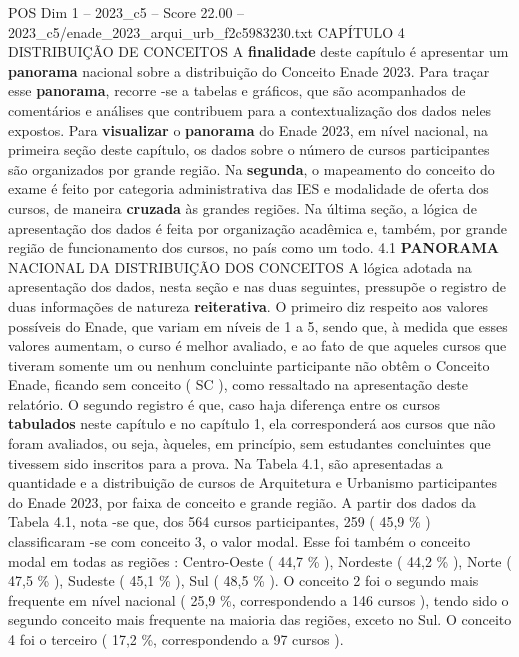\begin{textsample}{POS Dim 1 – 2023\_c5 – Score 22.00 – 2023\_c5/enade\_2023\_arqui\_urb\_f2c5983230.txt}  \label{ex:f1_pos_008}
CAPÍTULO 4 DISTRIBUIÇÃO DE CONCEITOS A \textbf{finalidade} deste capítulo é apresentar um \textbf{panorama} nacional sobre a distribuição do Conceito Enade 2023.
Para traçar esse \textbf{panorama}, recorre -se a tabelas e gráficos, que são acompanhados de comentários e análises que contribuem para a contextualização dos dados neles expostos.
Para \textbf{visualizar} o \textbf{panorama} do Enade 2023, em nível nacional, na primeira seção deste capítulo, os dados sobre o número de cursos participantes são organizados por grande região.
Na \textbf{segunda}, o mapeamento do conceito do exame é feito por categoria administrativa das IES e modalidade de oferta dos cursos, de maneira \textbf{cruzada} às grandes regiões.
Na última seção, a lógica de apresentação dos dados é feita por organização acadêmica e, também, por grande região de funcionamento dos cursos, no país como um todo. 4.1 \textbf{PANORAMA} NACIONAL DA DISTRIBUIÇÃO DOS CONCEITOS A lógica adotada na apresentação dos dados, nesta seção e nas duas seguintes, pressupõe o registro de duas informações de natureza \textbf{reiterativa}.
O primeiro diz respeito aos valores possíveis do Enade, que variam em níveis de 1 a 5, sendo que, à medida que esses valores aumentam, o curso é melhor avaliado, e ao fato de que aqueles cursos que tiveram somente um ou nenhum concluinte participante não obtêm o Conceito Enade, ficando sem conceito ( SC ), como ressaltado na apresentação deste relatório.
O segundo registro é que, caso haja diferença entre os cursos \textbf{tabulados} neste capítulo e no capítulo 1, ela corresponderá aos cursos que não foram avaliados, ou seja, àqueles, em princípio, sem estudantes concluintes que tivessem sido inscritos para a prova.
Na Tabela 4.1, são apresentadas a quantidade e a distribuição de cursos de Arquitetura e Urbanismo participantes do Enade 2023, por faixa de conceito e grande região.
A partir dos dados da Tabela 4.1, nota -se que, dos 564 cursos participantes, 259 ( 45,9 \% ) classificaram -se com conceito 3, o valor modal.
Esse foi também o conceito modal em todas as regiões : Centro-Oeste ( 44,7 \% ), Nordeste ( 44,2 \% ), Norte ( 47,5 \% ), Sudeste ( 45,1 \% ), Sul ( 48,5 \% ).
O conceito 2 foi o segundo mais frequente em nível nacional ( 25,9 \%, correspondendo a 146 cursos ), tendo sido o segundo conceito mais frequente na maioria das regiões, exceto no Sul.
O conceito 4 foi o terceiro ( 17,2 \%, correspondendo a 97 cursos ).

\end{textsample}
